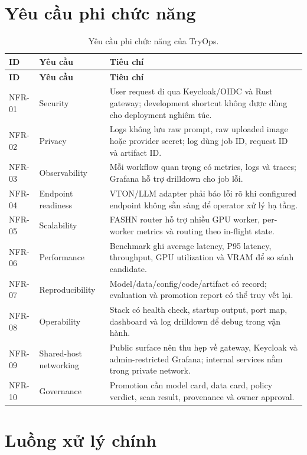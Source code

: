 \documentclass[12pt,a4paper,oneside]{report}
\begin{document}
\section{Yêu cầu phi chức năng}

\begingroup
\small
\begin{longtable}{p{2.05cm}p{4.25cm}p{7.85cm}}
\caption{Yêu cầu phi chức năng của TryOps.}\\
\toprule
\textbf{ID} & \textbf{Yêu cầu} & \textbf{Tiêu chí} \\
\midrule
\endfirsthead
\toprule
\textbf{ID} & \textbf{Yêu cầu} & \textbf{Tiêu chí} \\
\midrule
\endhead
NFR-01 & Security & User request đi qua Keycloak/OIDC và Rust gateway; development shortcut không được dùng cho deployment nghiêm túc. \\
NFR-02 & Privacy & Logs không lưu raw prompt, raw uploaded image hoặc provider secret; log dùng job ID, request ID và artifact ID. \\
NFR-03 & Observability & Mỗi workflow quan trọng có metrics, logs và traces; Grafana hỗ trợ drilldown cho job lỗi. \\
NFR-04 & Endpoint readiness & VTON/LLM adapter phải báo lỗi rõ khi configured endpoint không sẵn sàng để operator xử lý hạ tầng. \\
NFR-05 & Scalability & FASHN router hỗ trợ nhiều GPU worker, per-worker metrics và routing theo in-flight state. \\
NFR-06 & Performance & Benchmark ghi average latency, P95 latency, throughput, GPU utilization và VRAM để so sánh candidate. \\
NFR-07 & Reproducibility & Model/data/config/code/artifact có record; evaluation và promotion report có thể truy vết lại. \\
NFR-08 & Operability & Stack có health check, startup output, port map, dashboard và log drilldown để debug trong vận hành. \\
NFR-09 & Shared-host networking & Public surface nên thu hẹp về gateway, Keycloak và admin-restricted Grafana; internal services nằm trong private network. \\
NFR-10 & Governance & Promotion cần model card, data card, policy verdict, scan result, provenance và owner approval. \\
\bottomrule
\end{longtable}
\endgroup

\section{Luồng xử lý chính}
\end{document}
